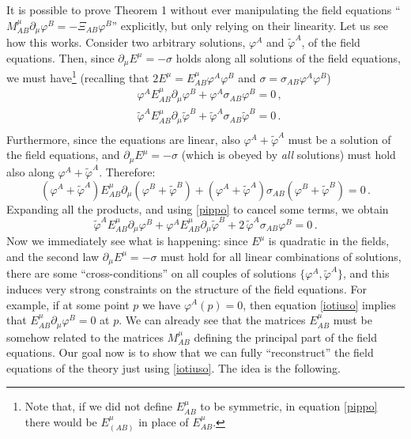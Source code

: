 \documentclass[aps,prl,singlecolumn,nofootinbib]{revtex4-2}
\theoremstyle{definition}
\theoremstyle{theorem}
\begin{document}
It is possible to prove Theorem 1 without ever manipulating the field equations ``$M^\mu_{AB}\partial_\mu \varphi^B = -\Xi_{AB}\varphi^B$'' explicitly, but only relying on their linearity. Let us see how this works. Consider two arbitrary solutions, $\varphi^A$ and $\tilde{\varphi}^A$, of the field equations. Then, since $\partial_\mu E^\mu =-\sigma$ holds along all solutions of the field equations, we must have\footnote{Note that, if we did not define $E^\mu_{AB}$ to be symmetric, in equation \eqref{pippo} there would be $E^\mu_{(AB)}$ in place of $E^\mu_{AB}$.} (recalling that $2E^\mu=E^\mu_{AB}\varphi^A \varphi^B$ and $\sigma=\sigma_{AB}\varphi^A \varphi^B$)
\begin{equation}\label{pippo}
\begin{split}
& \varphi^A E^\mu_{AB}\partial_\mu \varphi^B +\varphi^A \sigma_{AB}\varphi^B =0 \, , \\
& \tilde{\varphi}^A E^\mu_{AB}\partial_\mu \tilde{\varphi}^B +\tilde{\varphi}^A \sigma_{AB}\tilde{\varphi}^B =0 \, . \\
\end{split}
\end{equation}
Furthermore, since the equations are linear, also $\varphi^A+  \tilde{\varphi}^A$ must be a solution of the field equations, and $\partial_\mu E^\mu =-\sigma$ (which is obeyed by \textit{all} solutions) must hold also along $\varphi^A+  \tilde{\varphi}^A$. Therefore:
\begin{equation}\label{varuzzo}
(\varphi^A+ \tilde{\varphi}^A) E^\mu_{AB}\partial_\mu (\varphi^B+ \tilde{\varphi}^B) +(\varphi^A+ \tilde{\varphi}^A) \sigma_{AB}(\varphi^B+ \tilde{\varphi}^B) =0 \, .
\end{equation}
Expanding all the products, and using \eqref{pippo} to cancel some terms, we obtain
\begin{equation}\label{iotiuso}
\tilde{\varphi}^A E^\mu_{AB}\partial_\mu \varphi^B +\varphi^A E^\mu_{AB}\partial_\mu \tilde{\varphi}^B +2 \, \tilde{\varphi}^A \sigma_{AB}\varphi^B  =0 \, .
\end{equation}
Now we immediately see what is happening: since $E^\mu$ is quadratic in the fields, and the second law $\partial_\mu E^\mu =-\sigma$ must hold for all linear combinations of solutions, there are some ``cross-conditions'' on all couples of solutions $\{\varphi^A, \tilde{\varphi}^A \}$, and this induces very strong constraints on the structure of the field equations. For example, if at some point $p$ we have $\varphi^A(p)=0$, then equation \eqref{iotiuso} implies that $E^\mu_{AB}\partial_\mu \varphi^B=0$ at $p$. We can already see that the matrices $E^\mu_{AB}$ must be somehow related to the matrices $M^\mu_{AB}$ defining the principal part of the field equations. Our goal now is to show that we can fully ``reconstruct'' the field equations of the theory just using \eqref{iotiuso}. The idea is the following.
\end{document}
